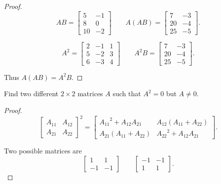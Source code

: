 \begin{proof}
    \[
        AB = \begin{bmatrix}
            5  & -1 \\
            8  & 0  \\
            10 & -2
        \end{bmatrix}
        \qquad
        A(AB) = \begin{bmatrix}
            7  & -3 \\
            20 & -4 \\
            25 & -5
        \end{bmatrix}.
    \]

    \[
        {A}^{2} = \begin{bmatrix}
            2 & -1 & 1 \\
            5 & -2 & 3 \\
            6 & -3 & 4
        \end{bmatrix}
        \qquad
        {A}^{2}B = \begin{bmatrix}
            7  & -3 \\
            20 & -4 \\
            25 & -5
        \end{bmatrix}.
    \]

    Thus $A(AB) = {A}^{2}B$.
\end{proof}

\begin{exercise}
    Find two different $2\times 2$ matrices $A$ such that ${A}^{2} = 0$ but $A\ne 0$.
\end{exercise}

\begin{proof}
    \[
        {\begin{bmatrix}
                    A_{11} & A_{12} \\
                    A_{21} & A_{22}
                \end{bmatrix}}^{2}
        =
        \begin{bmatrix}
            {A_{11}}^{2} + A_{12}A_{21} & A_{12}(A_{11} + A_{22})     \\
            A_{21}(A_{11} + A_{22})     & {A_{22}}^{2} + A_{12}A_{21}
        \end{bmatrix}.
    \]

    Two possible matrices are
    \[
        \begin{bmatrix}
            1  & 1  \\
            -1 & -1
        \end{bmatrix}\qquad
        \begin{bmatrix}
            -1 & -1 \\
            1  & 1
        \end{bmatrix}.
    \]
\end{proof}

